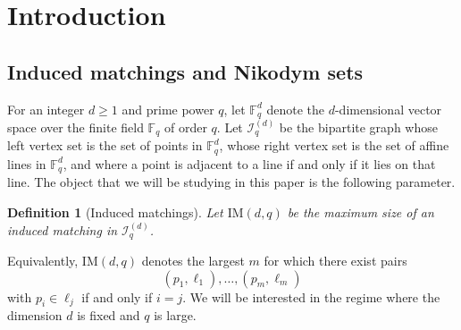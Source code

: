 \documentclass[12pt,reqno]{amsart}
\theoremstyle{plain}
\theoremstyle{definition}
\newtheorem{definition}[theorem]{Definition}
\newcommand{\F}{\mathbb{F}}
\newcommand{\IM}{\mathrm{IM}}
\newcommand{\II}{\mathcal{I}}
\newcommand{\1}{\mathbf{1}}
\begin{document}
\maketitle

\newpage

\tableofcontents

\newpage


\section{Introduction} \label{sec:intro}

\subsection{Induced matchings and Nikodym sets}


For an integer $d \geq 1$ and prime power $q$, let $\mathbb{F}_{q}^{d}$ denote the $d$-dimensional vector space over the finite field $\mathbb{F}_{q}$ of order $q$. Let $\II_q^{(d)}$ be the bipartite graph whose left vertex set is the set of points in $\F_q^d$, whose right vertex set is the set of affine lines in $\F_q^d$, and where a point is adjacent to a line if and only if it lies on that line. The object that we will be studying in this paper is the following parameter. 

\begin{definition}[Induced matchings]\label{def:imd}
{\it{Let $\IM(d,q)$ be the maximum size of an induced matching in $\II_q^{(d)}$.}}
\end{definition}
Equivalently, $\IM(d,q)$ denotes the largest $m$ for which there exist pairs
\[
  (p_1,\ell_1),\dots,(p_m,\ell_m)
\]
with $p_i\in\ell_j$ if and only if $i=j$. We will be interested in the regime where the dimension $d$ is fixed and $q$ is large. 
\end{document}
